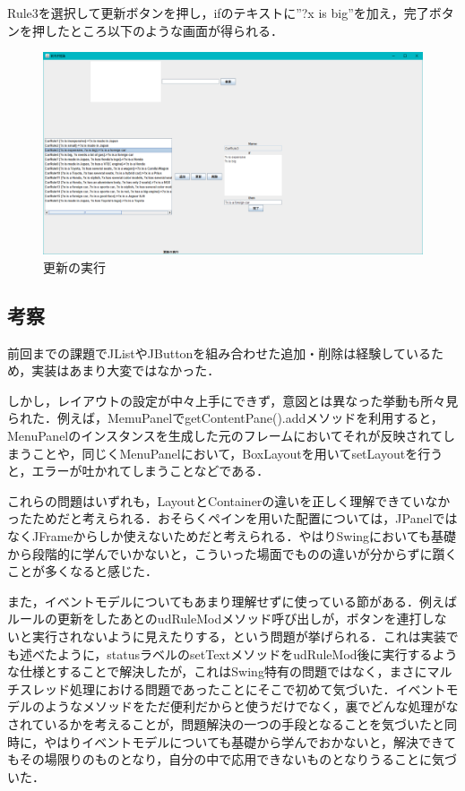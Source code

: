 \documentclass[12pt]{jarticle}
\begin{document}
Rule3を選択して更新ボタンを押し，ifのテキストに''?x is big''を加え，完了ボタンを押したところ以下のような画面が得られる．

\begin{figure}[!hbt]
  	\begin{center}
  		\includegraphics[scale=0.35]{images/gui7.png}
	\end{center}
  	\caption{更新の実行}
\end{figure}
\clearpage

\subsection{考察}
前回までの課題でJListやJButtonを組み合わせた追加・削除は経験しているため，実装はあまり大変ではなかった．

しかし，レイアウトの設定が中々上手にできず，意図とは異なった挙動も所々見られた．例えば，MemuPanelでgetContentPane().addメソッドを利用すると，MenuPanelのインスタンスを生成した元のフレームにおいてそれが反映されてしまうことや，同じくMenuPanelにおいて，BoxLayoutを用いてsetLayoutを行うと，エラーが吐かれてしまうことなどである．

これらの問題はいずれも，LayoutとContainerの違いを正しく理解できていなかったためだと考えられる．おそらくペインを用いた配置については，JPanelではなくJFrameからしか使えないためだと考えられる．やはりSwingにおいても基礎から段階的に学んでいかないと，こういった場面でものの違いが分からずに躓くことが多くなると感じた．

また，イベントモデルについてもあまり理解せずに使っている節がある．例えばルールの更新をしたあとのudRuleModメソッド呼び出しが，ボタンを連打しないと実行されないように見えたりする，という問題が挙げられる．これは実装でも述べたように，statusラベルのsetTextメソッドをudRuleMod後に実行するような仕様とすることで解決したが，これはSwing特有の問題ではなく，まさにマルチスレッド処理における問題であったことにそこで初めて気づいた．イベントモデルのようなメソッドをただ便利だからと使うだけでなく，裏でどんな処理がなされているかを考えることが，問題解決の一つの手段となることを気づいたと同時に，やはりイベントモデルについても基礎から学んでおかないと，解決できてもその場限りのものとなり，自分の中で応用できないものとなりうることに気づいた．
\end{document}
